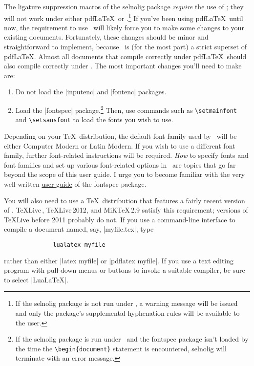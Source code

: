 \documentclass[11pt]{article}
\newcommand{\pkg}[1]{\textsf{#1}}
\newcommand{\cmmd}[1]{\texttt{\textbackslash #1}}
\begin{document}
\begingroup
\renewcommand\theenumi{(\roman{enumi})}
\renewcommand\labelenumi\theenumi

The ligature suppression macros of the \pkg{selnolig} package \emph{require} the use of \LuaLaTeX; they will not work under either pdf\LaTeX\ or \XeLaTeX.\footnote{If the \pkg{selnolig} package is not run under \LuaLaTeX, a warning message will be issued and only the package's supplemental hyphenation rules will be available to the user.}
If you've been using pdf\LaTeX\ until now, the requirement to use \LuaLaTeX\ will likely force you to make some changes to your existing documents. Fortunately, these changes should be minor and straightforward to implement, because \LuaLaTeX\ is (for the most part) a strict superset of pdf\LaTeX. Almost all documents that compile correctly under pdf\LaTeX\ should also compile correctly under \LuaLaTeX. The most important changes you'll need to make are: 
\begin{enumerate}
\item Do not load the |inputenc| and |fontenc| packages. 
\item Load the |fontspec| package.\footnote{If the \pkg{selnolig} package is run under \LuaLaTeX\ and the \pkg{fontspec} package isn't loaded by the time the \Verb+\begin{document}+ statement is encountered, \pkg{selnolig} will terminate with an error message.} Then, use commands such as \cmmd{setmainfont} and \cmmd{setsansfont} to load the fonts you wish to use.
\end{enumerate}
\endgroup


Depending on your \TeX\ distribution, the default font family used by \LuaLaTeX\ will be either Computer Modern or Latin Modern. If you wish to use a different font family, further font-related instructions will be required. \emph{How} to specify fonts and font families and set up various font-related options in \LuaLaTeX\ are topics that go far beyond the scope of this user guide. I urge you to become familiar with the very well-written
 \href{http://www.ctan.org/tex-archive/macros/latex/contrib/fontspec/fontspec.pdf}{user guide} of the \pkg{fontspec} package.

You will also need to use a \TeX\ distribution that features a fairly recent version of \LuaLaTeX. \TeX Live\,, \TeX Live\,2012, and MiK\TeX\,2.9 satisfy this requirement; versions of \TeX Live before 2011 probably do not. If you use a command-line interface to compile a document named, say, |myfile.tex|, type 
\begin{Verbatim}
              lualatex myfile
\end{Verbatim}
rather than either |latex myfile| or |pdflatex myfile|. If you use a text editing program with pull-down menus or buttons to invoke a suitable compiler, be sure to select |LuaLaTeX|. 
\end{document}
